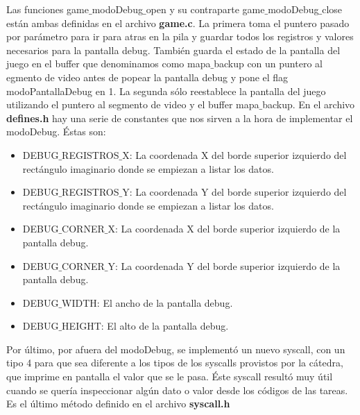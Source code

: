 Las funciones game$\_$modoDebug$\_$open y su contraparte game$\_$modoDebug$\_$close están ambas definidas en el archivo \textbf{game.c}. La primera toma el puntero pasado por parámetro para ir para atras en la pila y guardar todos los registros y valores necesarios para la pantalla debug. También guarda el estado de la pantalla del juego en el buffer que denominamos como mapa$\_$backup  con un puntero al egmento de video antes de popear la pantalla debug y pone el flag modoPantallaDebug en 1.
La segunda sólo reestablece la pantalla del juego utilizando el puntero al segmento de video y el buffer mapa$\_$backup.
\newline
En el archivo \textbf{defines.h} hay una serie de constantes que nos sirven a la hora de implementar el modoDebug. Éstas son:
\begin{itemize}
\item DEBUG$\_$REGISTROS$\_$X: La coordenada X del borde superior izquierdo del rectángulo imaginario donde se empiezan a listar los datos.
\item DEBUG$\_$REGISTROS$\_$Y: La coordenada Y del borde superior izquierdo del rectángulo imaginario donde se empiezan a listar los datos.
\item DEBUG$\_$CORNER$\_$X: La coordenada X del borde superior izquierdo de la pantalla debug.
\item DEBUG$\_$CORNER$\_$Y: La coordenada Y del borde superior izquierdo de la pantalla debug. 
\item DEBUG$\_$WIDTH: El ancho de la pantalla debug.
\item DEBUG$\_$HEIGHT: El alto de la pantalla debug.
\end{itemize}

Por último, por afuera del modoDebug, se implementó un nuevo syscall, con un tipo 4 para que sea diferente a los tipos de los syscalls provistos por la cátedra, que imprime en pantalla el valor que se le pasa. Éste syscall resultó muy útil cuando se quería inspeccionar algún dato o valor desde los códigos de las tareas. Es el último método definido en el archivo \textbf{syscall.h} 

